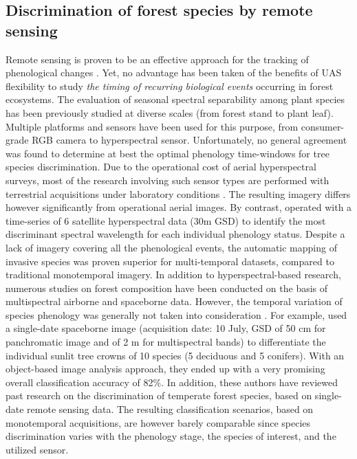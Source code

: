 \documentclass[remotesensing,article,submit,moreauthors,pdftex,12pt,a4paper]{mdpi} %
\begin{document}
\subsection{Discrimination of forest species by remote sensing}


Remote sensing is proven to be an effective approach for the tracking of phenological changes \cite{motohka_applicability_2010}. 
Yet, no advantage has been taken of the benefits of UAS flexibility to study \textit{the timing of recurring biological events} occurring in forest ecosystems. 
The evaluation of seasonal spectral separability among plant species has been previously studied at diverse scales (from forest stand to plant leaf). 
Multiple platforms and sensors have been used for this purpose, from consumer-grade RGB camera to hyperspectral sensor. 
Unfortunately, no general agreement was found to determine at best the optimal phenology time-windows for tree species discrimination. 
Due to the operational cost of aerial hyperspectral surveys, most of the research involving such sensor types are performed with terrestrial acquisitions under laboratory conditions \cite{burkholder_seasonal_2011, masaitis_influence_2013,cole_spectral_2014}. 
The resulting imagery differs however significantly from operational aerial images. 
By contrast, \citeauthor{somers_multi-temporal_2013} \cite{somers_multi-temporal_2013} operated with a time-series of 6 satellite hyperspectral data (30m GSD) to identify the most discriminant spectral wavelength for each individual phenology status. 
Despite a lack of imagery covering all the phenological events, the automatic mapping of invasive species was proven superior for multi-temporal datasets, compared to traditional monotemporal imagery.
In addition to hyperspectral-based research, numerous studies on forest composition have been conducted on the basis of multispectral airborne and spaceborne data. However, the temporal variation of species phenology was generally not taken into consideration \cite{heinzel_full_2008}. 
For example, \citeauthor{immitzer_tree_2012} \cite{immitzer_tree_2012} used a single-date spaceborne image (acquisition date: 10 July, GSD of 50 cm for panchromatic image and of 2 m for multispectral bands) to differentiate the individual sunlit tree crowns of 10 species (5 deciduous and 5 conifers). 
With an object-based image analysis approach, they ended up with a very promising overall classification accuracy of 82\%. 
In addition, these authors have reviewed past research on the discrimination of temperate forest species, based on single-date remote sensing data. 
The resulting classification scenarios, based on monotemporal acquisitions, are however barely comparable since species discrimination varies with the phenology stage, the species of interest, and the utilized sensor. 
\end{document}
